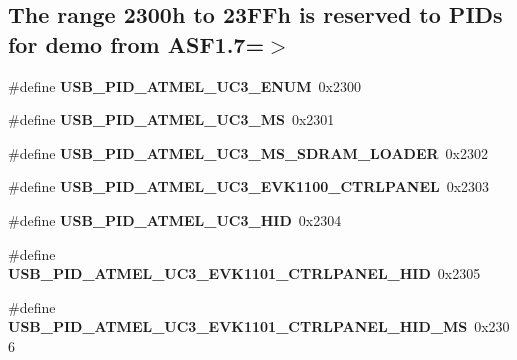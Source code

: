 \subsection*{The range 2300h to 23\-F\-Fh is reserved to P\-I\-Ds for demo from A\-S\-F1.7=$>$}
\begin{DoxyCompactItemize}
\item 
\hypertarget{group__usb__atmel__ids__group_ga03434816426bc21bbb384f9afe149f1e}{\#define {\bfseries U\-S\-B\-\_\-\-P\-I\-D\-\_\-\-A\-T\-M\-E\-L\-\_\-\-U\-C3\-\_\-\-E\-N\-U\-M}~0x2300}\label{group__usb__atmel__ids__group_ga03434816426bc21bbb384f9afe149f1e}

\item 
\hypertarget{group__usb__atmel__ids__group_ga3c3a8d8fc6c2d20b05e44b34a38c5159}{\#define {\bfseries U\-S\-B\-\_\-\-P\-I\-D\-\_\-\-A\-T\-M\-E\-L\-\_\-\-U\-C3\-\_\-\-M\-S}~0x2301}\label{group__usb__atmel__ids__group_ga3c3a8d8fc6c2d20b05e44b34a38c5159}

\item 
\hypertarget{group__usb__atmel__ids__group_gaf5cf42327c8324b093b5a247d472b525}{\#define {\bfseries U\-S\-B\-\_\-\-P\-I\-D\-\_\-\-A\-T\-M\-E\-L\-\_\-\-U\-C3\-\_\-\-M\-S\-\_\-\-S\-D\-R\-A\-M\-\_\-\-L\-O\-A\-D\-E\-R}~0x2302}\label{group__usb__atmel__ids__group_gaf5cf42327c8324b093b5a247d472b525}

\item 
\hypertarget{group__usb__atmel__ids__group_ga5abb96a63cda4c7fb60a5d56fe2158b2}{\#define {\bfseries U\-S\-B\-\_\-\-P\-I\-D\-\_\-\-A\-T\-M\-E\-L\-\_\-\-U\-C3\-\_\-\-E\-V\-K1100\-\_\-\-C\-T\-R\-L\-P\-A\-N\-E\-L}~0x2303}\label{group__usb__atmel__ids__group_ga5abb96a63cda4c7fb60a5d56fe2158b2}

\item 
\hypertarget{group__usb__atmel__ids__group_gae36d78d28923e15b4b58680c05d93946}{\#define {\bfseries U\-S\-B\-\_\-\-P\-I\-D\-\_\-\-A\-T\-M\-E\-L\-\_\-\-U\-C3\-\_\-\-H\-I\-D}~0x2304}\label{group__usb__atmel__ids__group_gae36d78d28923e15b4b58680c05d93946}

\item 
\hypertarget{group__usb__atmel__ids__group_ga90ee7ee99e3d7eecb8eeccc1e233eb0b}{\#define {\bfseries U\-S\-B\-\_\-\-P\-I\-D\-\_\-\-A\-T\-M\-E\-L\-\_\-\-U\-C3\-\_\-\-E\-V\-K1101\-\_\-\-C\-T\-R\-L\-P\-A\-N\-E\-L\-\_\-\-H\-I\-D}~0x2305}\label{group__usb__atmel__ids__group_ga90ee7ee99e3d7eecb8eeccc1e233eb0b}

\item 
\hypertarget{group__usb__atmel__ids__group_gad52a705633f06df68872d5b5f1184b15}{\#define {\bfseries U\-S\-B\-\_\-\-P\-I\-D\-\_\-\-A\-T\-M\-E\-L\-\_\-\-U\-C3\-\_\-\-E\-V\-K1101\-\_\-\-C\-T\-R\-L\-P\-A\-N\-E\-L\-\_\-\-H\-I\-D\-\_\-\-M\-S}~0x2306}\label{group__usb__atmel__ids__group_gad52a705633f06df68872d5b5f1184b15}


\end{DoxyCompactItemize}
